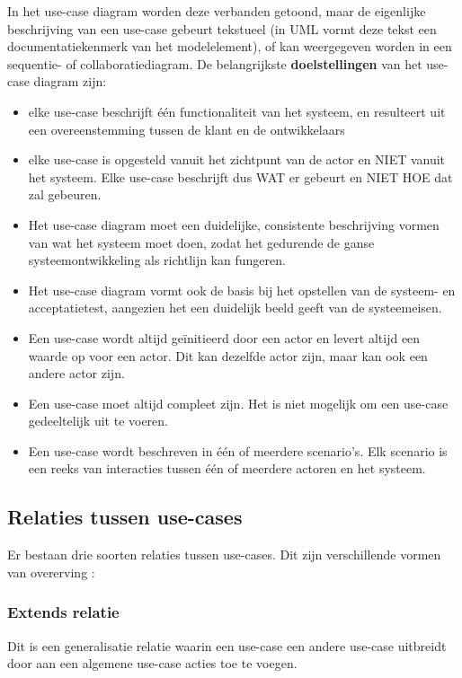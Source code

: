 In het use-case diagram worden deze verbanden getoond, maar de eigenlijke beschrijving van een use-case gebeurt tekstueel (in UML vormt deze tekst een documentatiekenmerk van het modelelement), of kan weergegeven worden in een sequentie- of collaboratiediagram.
\newpage
De belangrijkste \textbf{doelstellingen} van het use-case diagram zijn:

\begin{itemize}
    \item elke use-case beschrijft één functionaliteit van het systeem, en resulteert uit een overeenstemming tussen de klant en de ontwikkelaars
    \item elke use-case is opgesteld vanuit het zichtpunt van de actor en NIET vanuit het systeem. Elke use-case beschrijft dus WAT er gebeurt en NIET HOE dat zal gebeuren.
    \item Het use-case diagram moet een duidelijke, consistente beschrijving vormen van wat het systeem moet doen, zodat het gedurende de ganse systeemontwikkeling als richtlijn kan fungeren.
    \item Het use-case diagram vormt ook de basis bij het opstellen van de systeem- en acceptatietest, aangezien het een duidelijk beeld geeft van de systeemeisen.
    \item Een use-case wordt altijd geïnitieerd door een actor en levert altijd een waarde op voor een actor. Dit kan dezelfde actor zijn, maar kan ook een andere actor zijn.
    \item Een use-case moet altijd compleet zijn. Het is niet mogelijk om een use-case gedeeltelijk uit te voeren. 
    \item Een use-case wordt beschreven in één of meerdere scenario's. Elk scenario is een reeks van interacties tussen één of meerdere actoren en het systeem.
\end{itemize}

\subsection{Relaties tussen use-cases}

Er bestaan drie soorten relaties tussen use-cases. Dit zijn verschillende vormen van overerving :

\subsubsection{Extends relatie}

Dit is een generalisatie relatie waarin een use-case een andere use-case uitbreidt door aan een algemene use-case acties toe te voegen. 

